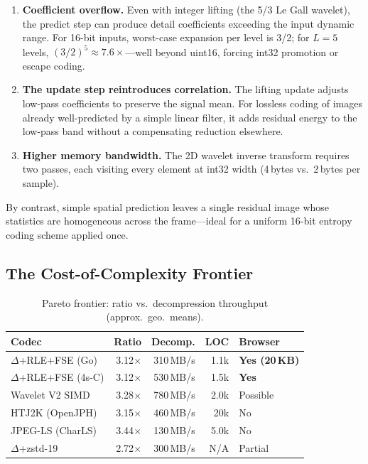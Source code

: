 \documentclass[10pt,twocolumn]{article}
\begin{document}
\begin{enumerate}
  \item \textbf{Coefficient overflow.} Even with integer lifting (the 5/3 Le
  Gall wavelet), the predict step can produce detail coefficients exceeding the
  input dynamic range. For 16-bit inputs, worst-case expansion per level is 3/2;
  for $L=5$ levels, $(3/2)^5 \approx 7.6\times$---well beyond uint16, forcing
  int32 promotion or escape coding.

  \item \textbf{The update step reintroduces correlation.} The lifting update
  adjusts low-pass coefficients to preserve the signal mean. For lossless coding
  of images already well-predicted by a simple linear filter, it adds residual
  energy to the low-pass band without a compensating reduction elsewhere.

  \item \textbf{Higher memory bandwidth.} The 2D wavelet inverse transform
  requires two passes, each visiting every element at int32 width (4\,bytes vs.\
  2\,bytes per sample).
\end{enumerate}

By contrast, simple spatial prediction leaves a single residual image whose
statistics are homogeneous across the frame---ideal for a uniform 16-bit entropy
coding scheme applied once.

\subsection{The Cost-of-Complexity Frontier}

\begin{table}[htbp]
\centering
\footnotesize
\setlength{\tabcolsep}{4pt}
\caption{Pareto frontier: ratio vs.\ decompression throughput (approx.\ geo.\ means).}
\label{tab:pareto}
\setlength{\tabcolsep}{2pt}
\begin{tabular}{lrrrp{1.5cm}}
\toprule
Codec & Ratio & Decomp. & LOC & Browser \\
\midrule
$\Delta$+RLE+FSE (Go)   & 3.12$\times$ & 310\,MB/s & 1.1k & \textbf{Yes (20\,KB)} \\
$\Delta$+RLE+FSE (4s-C) & 3.12$\times$ & 530\,MB/s & 1.5k & \textbf{Yes} \\
Wavelet V2 SIMD         & 3.28$\times$ & 780\,MB/s & 2.0k & Possible \\
HTJ2K (OpenJPH)         & 3.15$\times$ & 460\,MB/s & 20k  & No \\
JPEG-LS (CharLS)        & 3.44$\times$ & 130\,MB/s & 5.0k & No \\
$\Delta$+zstd-19        & 2.72$\times$ & 300\,MB/s & N/A  & Partial \\
\bottomrule
\end{tabular}
\end{table}
\end{document}
